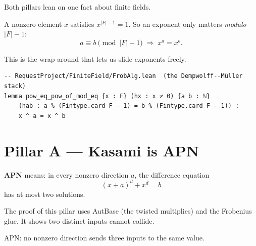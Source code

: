 \documentclass[11pt]{article}
\begin{document}
Both pillars lean on one fact about finite fields.

A nonzero element $x$ satisfies $x^{|F|-1}=1$.
So an exponent only matters \emph{modulo} $|F|-1$:
\[
  a \equiv b \pmod{|F|-1} \;\Longrightarrow\; x^{a} = x^{b} .
\]

This is the wrap-around that lets us slide exponents freely.

\begin{center}
\end{center}

\begin{lstlisting}
-- RequestProject/FiniteField/FrobAlg.lean  (the Dempwolff--Müller stack)
lemma pow_eq_pow_of_mod_eq {x : F} (hx : x ≠ 0) {a b : ℕ}
    (hab : a % (Fintype.card F - 1) = b % (Fintype.card F - 1)) :
    x ^ a = x ^ b
\end{lstlisting}

\section{Pillar A --- Kasami is APN}

\textbf{APN} means: in every nonzero direction $a$, the difference equation
\[
  (x+a)^{d} + x^{d} = b
\]
has at most two solutions.

The proof of this pillar uses AutBase (the twisted multiplies) and the
Frobenius glue.  It shows two distinct inputs cannot collide.

\begin{center}

{\small APN: no nonzero direction sends three inputs to the same value.}
\end{center}
\end{document}
